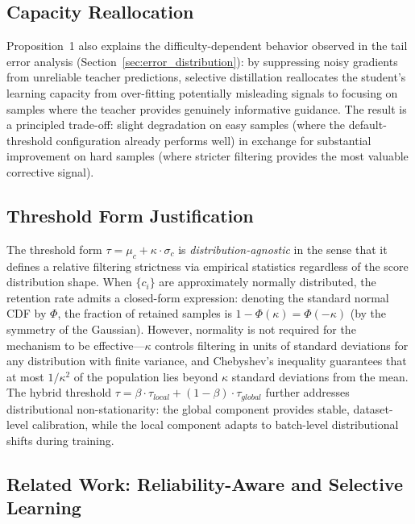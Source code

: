 \subsection{Capacity Reallocation}

Proposition~1 also explains the difficulty-dependent behavior observed in the tail error analysis (Section~\ref{sec:error_distribution}): by suppressing noisy gradients from unreliable teacher predictions, selective distillation reallocates the student's learning capacity from over-fitting potentially misleading signals to focusing on samples where the teacher provides genuinely informative guidance. The result is a principled trade-off: slight degradation on easy samples (where the default-threshold configuration already performs well) in exchange for substantial improvement on hard samples (where stricter filtering provides the most valuable corrective signal).

\subsection{Threshold Form Justification}

The threshold form $\tau = \mu_c + \kappa \cdot \sigma_c$ is \emph{distribution-agnostic} in the sense that it defines a relative filtering strictness via empirical statistics regardless of the score distribution shape. When $\{c_i\}$ are approximately normally distributed, the retention rate admits a closed-form expression: denoting the standard normal CDF by $\Phi$, the fraction of retained samples is $1 - \Phi(\kappa) = \Phi(-\kappa)$ (by the symmetry of the Gaussian). However, normality is not required for the mechanism to be effective---$\kappa$ controls filtering in units of standard deviations for any distribution with finite variance, and Chebyshev's inequality guarantees that at most $1/\kappa^2$ of the population lies beyond $\kappa$ standard deviations from the mean. The hybrid threshold $\tau = \beta \cdot \tau_{local} + (1-\beta) \cdot \tau_{global}$ further addresses distributional non-stationarity: the global component provides stable, dataset-level calibration, while the local component adapts to batch-level distributional shifts during training.

\subsection{Related Work: Reliability-Aware and Selective Learning}
\label{sec:appendix_selective_learning}

